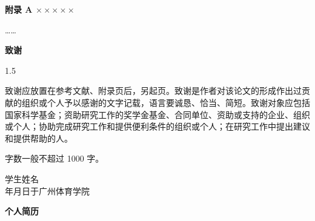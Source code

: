 \documentclass[UTF8,zihao=-4,twoside,openany]{ctexbook}
\newcommand{\dateunderline}{\underline{\makebox[1.2cm]{}}年\underline{\makebox[0.8cm]{}}月\underline{\makebox[0.8cm]{}}日}
\begin{document}
\clearpage
{}
\begin{center}
  {\heiti\bfseries\fontsize{16pt}{16pt}\selectfont 附录 A $\times\times\times\times\times$}
  \vspace{18pt}
\end{center}

……

\clearpage
{}
\begin{center}
  {\heiti\bfseries\fontsize{16pt}{16pt}\selectfont 致\quad 谢}
  \vspace{18pt}
\end{center}

\begin{spacing}{1.5}
{\fangsong\fontsize{12pt}{12pt}\selectfont
致谢应放置在参考文献、附录页后，另起页。致谢是作者对该论文的形成作出过贡献的组织或个人予以感谢的文字记载，语言要诚恳、恰当、简短。致谢对象应包括国家科学基金；资助研究工作的奖学金基金、合同单位、资助或支持的企业、组织或个人；协助完成研究工作和提供便利条件的组织或个人；在研究工作中提出建议和提供帮助的人。

字数一般不超过 1000 字。

\vspace{3.5cm}
\begin{flushright}
  学生姓名\qquad\qquad\quad \\[0.4cm]
  \dateunderline 于广州体育学院
\end{flushright}
}
\end{spacing}

\clearpage
{}
\begin{center}
  {\heiti\bfseries\fontsize{16pt}{16pt}\selectfont 个人简历}
  \vspace{18pt}
\end{center}
\end{document}
